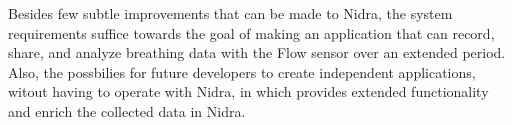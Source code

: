 Besides few subtle improvements that can be made to Nidra, the system requirements suffice towards the goal of making an application that can record, share, and analyze breathing data with the Flow sensor over an extended period. Also, the possbilies for future developers to create independent applications, witout having to operate with Nidra, in which provides extended functionality and enrich the collected data in Nidra. 